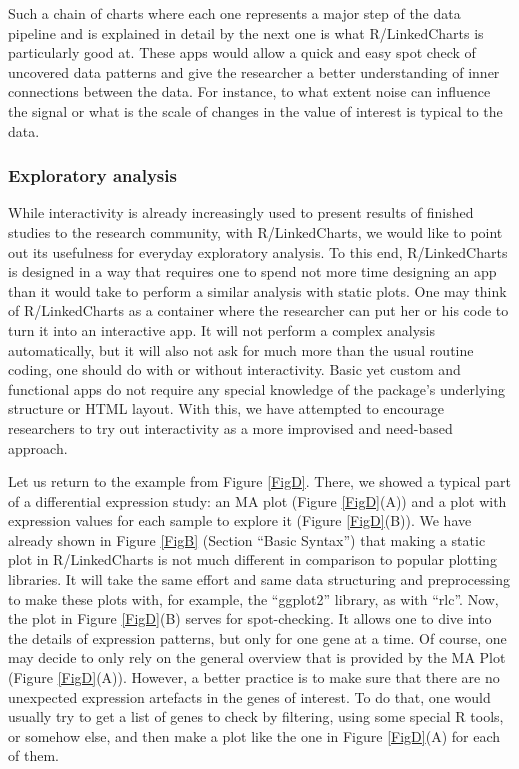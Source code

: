 \documentclass[twocolumn,10pt]{article}
\begin{document}
Such a chain of charts where each one represents a major step of the data pipeline and is explained in detail by the next one is what R/LinkedCharts is particularly good at. These apps would allow a quick and easy spot check of uncovered data patterns and give the researcher a better understanding of inner connections between the data. For instance, to what extent noise can influence the signal or what is the scale of changes in the value of interest is typical to the data.

\subsubsection{Exploratory analysis}

While interactivity is already increasingly used to present results of finished studies to the research community, with R/LinkedCharts, we would like to point out its usefulness for everyday exploratory analysis. To this end, R/LinkedCharts is designed in a way that requires one to spend not more time designing an app than it would take to perform a similar analysis with static plots. One may think of R/LinkedCharts as a container where the researcher can put her or his code to turn it into an interactive app. It will not perform a complex analysis automatically, but it will also not ask for much more than the usual routine coding, one should do with or without interactivity. Basic yet custom and functional apps do not require any special knowledge of the package's underlying structure or HTML layout. With this, we have attempted to encourage researchers to try out interactivity as a more improvised and need-based approach.

Let us return to the example from Figure \ref{FigD}. There, we showed a typical part of a differential expression study: an MA plot (Figure \ref{FigD}(A)) and a plot with expression values for each sample to explore it (Figure \ref{FigD}(B)). We have already shown in Figure \ref{FigB} (Section ``Basic Syntax'') that making a static plot in R/LinkedCharts is not much different in comparison to popular plotting libraries. It will take the same effort and same data structuring and preprocessing to make these plots with, for example, the ``ggplot2'' library, as with ``rlc''. Now, the plot in Figure \ref{FigD}(B) serves for spot-checking. It allows one to dive into the details of expression patterns, but only for one gene at a time. Of course, one may decide to only rely on the general overview that is provided by the MA Plot (Figure \ref{FigD}(A)). However, a better practice is to make sure that there are no unexpected expression artefacts in the genes of interest. To do that, one would usually try to get a list of genes to check by filtering, using some special R tools, or somehow else, and then make a plot like the one in Figure \ref{FigD}(A) for each of them.
\end{document}
